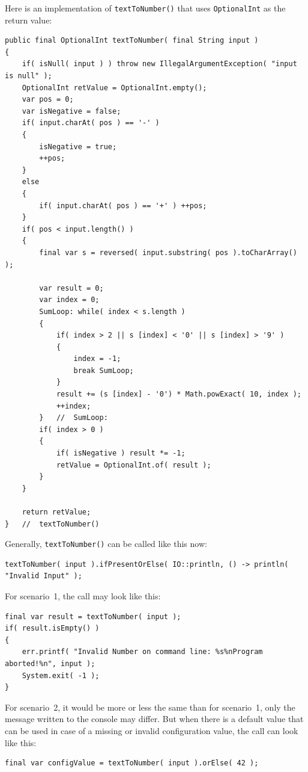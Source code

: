 Here is an implementation of \lstinline|textToNumber()| that uses \lstinline|OptionalInt| as the return value: 
\begin{lstlisting}
public final OptionalInt textToNumber( final String input )
{
    if( isNull( input ) ) throw new IllegalArgumentException( "input is null" );
    OptionalInt retValue = OptionalInt.empty();
    var pos = 0;
    var isNegative = false;
    if( input.charAt( pos ) == '-' )
    {
        isNegative = true;
        ++pos;
    }
    else
    {
        if( input.charAt( pos ) == '+' ) ++pos;
    }
    if( pos < input.length() )
    {
        final var s = reversed( input.substring( pos ).toCharArray() );

        var result = 0;
        var index = 0;
        SumLoop: while( index < s.length )
        {
            if( index > 2 || s [index] < '0' || s [index] > '9' )
            {
                index = -1;
                break SumLoop;
            }
            result += (s [index] - '0') * Math.powExact( 10, index );
            ++index;
        }   //  SumLoop:
        if( index > 0 )
        {
            if( isNegative ) result *= -1;
            retValue = OptionalInt.of( result );
        }
    }

    return retValue;
}   //  textToNumber()
\end{lstlisting}

Generally, \lstinline|textToNumber()| can be called like this now:
\begin{lstlisting}
textToNumber( input ).ifPresentOrElse( IO::println, () -> println( "Invalid Input" );
\end{lstlisting}

For scenario~1, the call may look like this:
\begin{lstlisting}
final var result = textToNumber( input );
if( result.isEmpty() )
{
    err.printf( "Invalid Number on command line: %s%nProgram aborted!%n", input );
    System.exit( -1 );
}
\end{lstlisting}

For scenario~2, it would be more or less the same than for scenario~1, only the message written to the console may differ. But when there is a default value that can be used in case of a missing or invalid configuration value, the call can look like this:
\begin{lstlisting}
final var configValue = textToNumber( input ).orElse( 42 );
\end{lstlisting}

